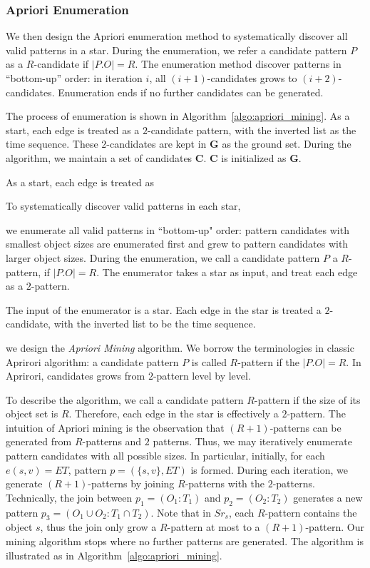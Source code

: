 \subsubsection{Apriori Enumeration}
We then design the Apriori enumeration method to
systematically discover all valid patterns in a star.
During the enumeration, we refer a candidate pattern
$P$ as a $R$-candidate if $|P.O|=R$. The enumeration
method discover patterns in ``bottom-up'' order:
in iteration $i$,  all $(i+1)$-candidates grows
to $(i+2)$-candidates. Enumeration ends if no
further candidates can be generated.

The process of enumeration is shown 
in Algorithm~\ref{algo:apriori_mining}. As a start, 
each edge is treated as a $2$-candidate pattern, with the 
inverted list as the time sequence. These $2$-candidates
are kept in $\mathbf{G}$ as the ground set. During the algorithm,
we maintain a set of candidates $\mathbf{C}$. $\mathbf{C}$
is initialized as $\mathbf{G}$.



As a start, each edge is treated as 



To systematically discover valid patterns in each star, 


we enumerate all valid patterns in ``bottom-up" order: 
pattern candidates with smallest object sizes are enumerated
first and grew to pattern candidates with larger object sizes.
During the enumeration, we call a candidate pattern
$P$ a $R$-pattern, if $|P.O|=R$.  The enumerator takes
a star as input, and treat each edge as a $2$-pattern.


The input of
the enumerator is a star. Each edge
in the star is treated a $2$-candidate, with the inverted
list to be the time sequence.  

we design the \emph{Apriori Mining} algorithm. We borrow
the terminologies in classic Aprirori algorithm: a candidate
pattern $P$ is called $R$-pattern if the $|P.O|=R$. In Aprirori,
candidates grows from $2$-pattern level by level.


To describe the algorithm, we call a candidate pattern $R$-pattern 
if the size of its object set is $R$.  Therefore, each edge
in the star is effectively a $2$-pattern. The intuition of Apriori mining
is the observation that $(R+1)$-patterns can be generated
from $R$-patterns and $2$ patterns. Thus, we may iteratively 
enumerate pattern candidates with all possible sizes.
In particular, initially, for each $e(s,v)=ET$, pattern $p=(\{s,v\}, ET)$ is formed. 
During each iteration, we generate $(R+1)$-patterns by joining $R$-patterns 
with the $2$-patterns. Technically, the join between $p_1=(O_1:T_1)$ and $p_2=(O_2:T_2)$
generates a new pattern $p_3=(O_1 \cup O_2:T_1 \cap T_2)$. Note that in $Sr_s$,
each $R$-pattern contains the object $s$, thus the join only 
grow a $R$-pattern at most to a $(R+1)$-pattern.
Our mining algorithm stops where no further patterns are generated. 
The algorithm is illustrated as in Algorithm~\ref{algo:apriori_mining}.

